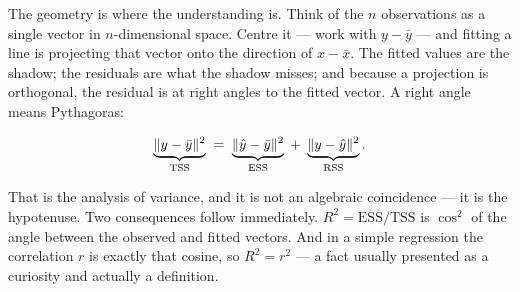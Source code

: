 \documentclass[
  letterpaper,
  10pt,
  twoside,
  openright,
  numbers=noenddot,
  chapterprefix=true]{scrbook}
\begin{document}
The geometry is where the understanding is. Think of the \(n\)
observations as a single vector in \(n\)-dimensional space. Centre it
--- work with \(y - \bar y\) --- and fitting a line is projecting that
vector onto the direction of \(x - \bar x\). The fitted values are the
shadow; the residuals are what the shadow misses; and because a
projection is orthogonal, the residual is at right angles to the fitted
vector. A right angle means Pythagoras:

\[
\underbrace{\lVert y - \bar y\rVert^2}_{\text{TSS}}
\thickspace=\thickspace
\underbrace{\lVert \hat y - \bar y\rVert^2}_{\text{ESS}}
\thickspace+\thickspace
\underbrace{\lVert y - \hat y\rVert^2}_{\text{RSS}} .
\]

That is the analysis of variance, and it is not an algebraic coincidence
--- it is the hypotenuse. Two consequences follow immediately.
\(R^2 = \mathrm{ESS} /
\mathrm{TSS}\) is \(\cos^2\) of the angle between the observed and
fitted vectors. And in a simple regression the correlation \(r\) is
exactly that cosine, so \(R^2 = r^2\) --- a fact usually presented as a
curiosity and actually a definition.
\end{document}

